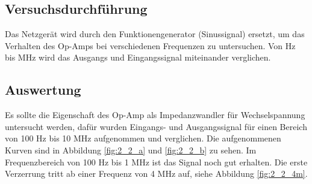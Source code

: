 \documentclass[12pt,a4paper]{article}
\begin{document}
\subsection{Versuchsdurchführung}
Das Netzgerät wird durch den Funktionengenerator (Sinussignal) ersetzt, um das Verhalten des Op-Amps bei verschiedenen Frequenzen zu untersuchen. Von \unit[100]{Hz} bis \unit[10]{MHz} wird das Ausgangs und Eingangssignal miteinander verglichen.

\subsection{Auswertung}


Es sollte die Eigenschaft des Op-Amp als Impedanzwandler für Wechselspannung untersucht werden, dafür wurden Eingangs- und Ausgangssignal für einen Bereich von 100 Hz bis 10 MHz aufgenommen und verglichen. Die aufgenommenen Kurven sind in Abbildung \ref{fig:2_2_a} und \ref{fig:2_2_b} zu sehen. Im Frequenzbereich von 100 Hz bis 1 MHz ist das Signal noch gut erhalten. Die erste Verzerrung tritt ab einer Frequenz von 4 MHz auf, siehe Abbildung \ref{fig:2_2_4m}.
\end{document}
